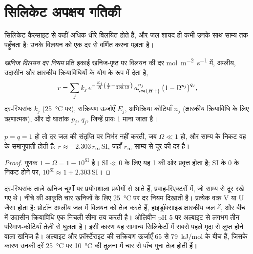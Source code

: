 \section{सिलिकेट अपक्षय गतिकी}\label{sec:b3:water-rock-interaction:kinetics}

सिलिकेट कैल्साइट से कहीं अधिक धीरे विलयित होते हैं, और
जल शायद ही कभी उनके साथ साम्य तक पहुँचता है: उनके विलयन को एक दर से वर्णित करना पड़ता है।

\begin{definition}[खनिज विलयन दर नियम]\label{def:b3:water-rock-interaction:rate-law}
\emph{खनिज विलयन दर नियम}
प्रति इकाई खनिज-पृष्ठ पर विलयन की दर
\unit{mol.m^{-2}.s^{-1}} में, अम्लीय, उदासीन और क्षारकीय क्रियाविधियों के योग के रूप में देता है,
\[
r = \sum_j k_j\,e^{-\frac{E_j}{R}\left(\frac1T - \frac1{298.15}\right)}\,
a_{\ce{H+}}^{n_j}\,\bigl(1 - \Omega^{p_j}\bigr)^{q_j},
\]
दर-स्थिरांक $k_j$ (\qty{25}{\celsius} पर), सक्रियण ऊर्जाएँ $E_j$,
अभिक्रिया कोटियाँ $n_j$ (क्षारकीय क्रियाविधि के लिए ऋणात्मक), और दो घातांक
$p_j$, $q_j$, जिन्हें प्रायः 1 माना जाता है।
\end{definition}

\begin{proposition}[साम्य से दूर और साम्य के निकट]\label{prop:b3:water-rock-interaction:affinity}
$p = q = 1$ हो तो दर जल की संतृप्ति पर निर्भर नहीं करती,
जब $\Omega \ll 1$ हो, और साम्य के निकट वह  के
समानुपाती होती है: $r \approx -2.303\,r_\infty\,\mathrm{SI}$, जहाँ
$r_\infty$ साम्य से दूर की दर है।
\end{proposition}

\begin{proof}
गुणक $1 - \Omega = 1 - 10^{\mathrm{SI}}$ है। $\mathrm{SI} \ll 0$ के लिए यह
1 की ओर प्रवृत्त होता है; $\mathrm{SI}$ के 0 के निकट होने पर, $10^{\mathrm{SI}} \approx 1 +
2.303\,\mathrm{SI}$।
\end{proof}

दर-स्थिरांक ताज़े खनिज चूर्णों पर प्रयोगशाला प्रयोगों से आते हैं,
प्रवाह-रिएक्टरों में, जो साम्य से दूर रखे गए थे। नीचे की आकृति
चार खनिजों के लिए \qty{25}{\celsius} पर दर नियम दिखाती है। प्रत्येक वक्र V या
U जैसा होता है: प्रोटॉन अम्लीय जल में विलयन को तेज़ करते हैं, हाइड्रॉक्साइड क्षारकीय जल में, और
बीच में उदासीन क्रियाविधि एक निचली सीमा तय करती है। ओलिवीन pH 5 पर अल्बाइट से लगभग तीन
परिमाण-कोटियाँ तेज़ी से घुलता है। इसी कारण यह सामान्य सिलिकेटों में सबसे पहले
मृदा से लुप्त होने वाला खनिज है। अल्बाइट और फ़ॉर्स्टेराइट की सक्रियण ऊर्जाएँ
65 से \qty{79}{kJ/mol} के बीच हैं, जिसके कारण उनकी दरें
\qty{25}{\celsius} पर \qty{10}{\celsius} की तुलना में चार से पाँच गुना तेज़ होती हैं।

